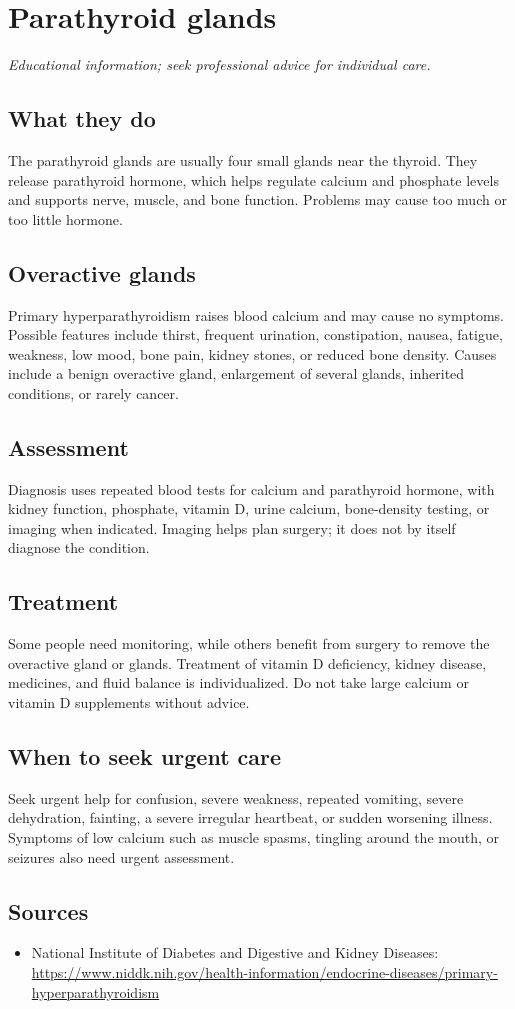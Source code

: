 \chapter{Parathyroid glands}

\medskip
\noindent\textit{Educational information; seek professional advice for individual care.}

\section*{What they do}
The parathyroid glands are usually four small glands near the thyroid. They release parathyroid hormone, which helps regulate calcium and phosphate levels and supports nerve, muscle, and bone function. Problems may cause too much or too little hormone.

\section*{Overactive glands}
Primary hyperparathyroidism raises blood calcium and may cause no symptoms. Possible features include thirst, frequent urination, constipation, nausea, fatigue, weakness, low mood, bone pain, kidney stones, or reduced bone density. Causes include a benign overactive gland, enlargement of several glands, inherited conditions, or rarely cancer.

\section*{Assessment}
Diagnosis uses repeated blood tests for calcium and parathyroid hormone, with kidney function, phosphate, vitamin D, urine calcium, bone-density testing, or imaging when indicated. Imaging helps plan surgery; it does not by itself diagnose the condition.

\section*{Treatment}
Some people need monitoring, while others benefit from surgery to remove the overactive gland or glands. Treatment of vitamin D deficiency, kidney disease, medicines, and fluid balance is individualized. Do not take large calcium or vitamin D supplements without advice.

\section*{When to seek urgent care}
Seek urgent help for confusion, severe weakness, repeated vomiting, severe dehydration, fainting, a severe irregular heartbeat, or sudden worsening illness. Symptoms of low calcium such as muscle spasms, tingling around the mouth, or seizures also need urgent assessment.

\section*{Sources}
\begin{itemize}
\item National Institute of Diabetes and Digestive and Kidney Diseases: \url{https://www.niddk.nih.gov/health-information/endocrine-diseases/primary-hyperparathyroidism}
\end{itemize}
